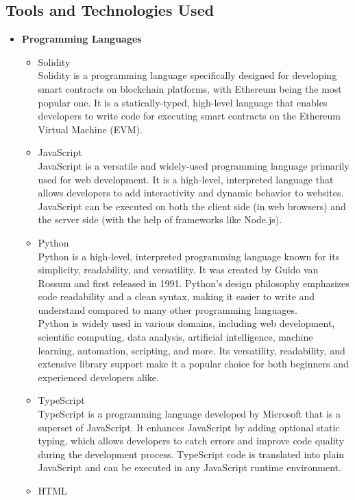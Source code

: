\documentclass[oneside, 12pt]{book}
\begin{document}
\subsection{Tools and Technologies Used}
\begin{itemize}
	\item\textbf{Programming Languages}
	\begin{itemize}
		\item Solidity
		      \\Solidity is a programming language specifically designed for developing smart contracts on blockchain platforms, with Ethereum being the most popular one. It is a statically-typed, high-level language that enables developers to write code for executing smart contracts on the Ethereum Virtual Machine (EVM).
		\item JavaScript
		      \\JavaScript is a versatile and widely-used programming language primarily used for web development. It is a high-level, interpreted language that allows developers to add interactivity and dynamic behavior to websites. JavaScript can be executed on both the client side (in web browsers) and the server side (with the help of frameworks like Node.js).
		\item Python
		      \\Python is a high-level, interpreted programming language known for its simplicity, readability, and versatility. It was created by Guido van Rossum and first released in 1991. Python's design philosophy emphasizes code readability and a clean syntax, making it easier to write and understand compared to many other programming languages.
		      \\Python is widely used in various domains, including web development, scientific computing, data analysis, artificial intelligence, machine learning, automation, scripting, and more. Its versatility, readability, and extensive library support make it a popular choice for both beginners and experienced developers alike.
		\item TypeScript
		      \\TypeScript is a programming language developed by Microsoft that is a superset of JavaScript. It enhances JavaScript by adding optional static typing, which allows developers to catch errors and improve code quality during the development process. TypeScript code is translated into plain JavaScript and can be executed in any JavaScript runtime environment.
		\item HTML

\end{itemize}
\end{itemize}
\end{document}
